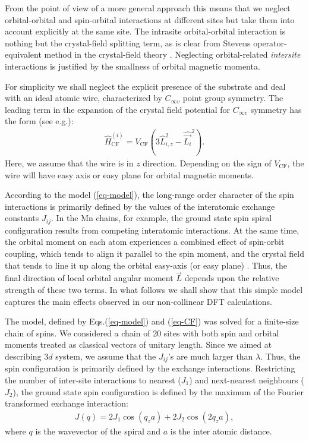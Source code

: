 \documentclass[prl,final,twocolumn]{revtex4-1}
\begin{document}
From the point of view of a more general approach \cite{SECCHI201561} this means that we neglect orbital-orbital and spin-orbital interactions at different sites but take them into account explicitly at the same site. The intrasite orbital-orbital interaction is nothing but the crystal-field splitting term, as is clear from Stevens operator-equivalent method in the crystal-field theory \cite{Stevens}. Neglecting orbital-related {\it intersite} interactions is justified by the smallness of orbital magnetic momenta. 

For simplicity we shall neglect the explicit presence of the substrate and deal with an ideal atomic wire, characterized by $C_{\infty v}$ point group symmetry. The leading term in the expansion of the crystal field potential for $C_{\infty v}$ symmetry has the form (see e.g.\cite{MULAK200053}):
\begin{eqnarray}
\hat H^{(i)}_{\mathrm{CF}} = V_{\mathrm{CF}} (3\hat L^2_{i,z}- \hat{\vec {L_i}}^2).
\label{eq-CF}
\end{eqnarray}
Here, we assume that the wire is in $z$ direction. 
Depending on the sign of $V_{\mathrm{CF}}$, the wire will have easy axis or easy plane for orbital magnetic moments.

According to the model (\ref{eq-model}), the long-range order character of the spin interactions is primarily defined by the values of the interatomic exchange constants $J_{ij}$. In the Mn chains, for example, the ground state spin spiral configuration results from competing interatomic interactions. At the same time, the orbital moment on each atom experiences a combined effect of spin-orbit coupling, which tends to align it parallel to the spin moment, and the crystal field that tends to line it up along the orbital easy-axis (or easy plane) \cite{Laan_2001}. Thus, the final direction of local orbital angular moment $\vec L$ depends upon the relative strength of these two terms.
In what follows we shall show that this simple model captures the main effects observed in our non-collinear DFT calculations.

The model, defined by Eqs.(\ref{eq-model}) and (\ref{eq-CF}) was solved for a finite-size chain of spins. We considered a chain of 20 sites with both spin and orbital moments treated as classical vectors of unitary length.
Since we aimed at describing $3d$ system, we assume that the $J_{ij}$'s are much larger than $\lambda$. 
Thus, the spin configuration is primarily defined by the exchange interactions.
Restricting the number of inter-site interactions to nearest ($J_1$) and next-nearest neighbours ($J_2$), the ground state spin configuration is defined by the maximum of the Fourier transformed exchange interaction:
\begin{eqnarray}
J(q)=2J_1\cos(q_z a)+2J_2\cos(2q_z a),
\end{eqnarray}
where $q$ is the wavevector of the spiral and $a$ is the inter atomic distance. 
\end{document}
